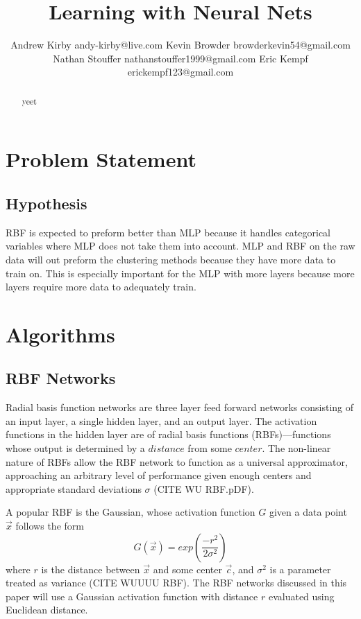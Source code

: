 \documentclass[twoside,11pt]{article}
\begin{document}
\title{Learning with Neural Nets}

\author{\name Andrew Kirby \email andy-kirby@live.com \AND
		\name Kevin Browder \email browderkevin54@gmail.com \AND
		\name Nathan Stouffer \email nathanstouffer1999@gmail.com \AND
		\name Eric Kempf \email erickempf123@gmail.com }

\maketitle

\begin{abstract}
yeet
\end{abstract}

\section{Problem Statement}



\subsection*{Hypothesis}
RBF is expected to preform better than MLP because it handles categorical variables where MLP does not take them into account. MLP and RBF on the raw data will out preform the clustering methods because they have more data to train on. This is especially important for the MLP with more layers because more layers require more data to adequately train.
\section{Algorithms}
\subsection{RBF Networks}
	Radial basis function networks are three layer feed forward networks consisting of an input layer, a single hidden layer, and an output layer. The activation functions in the hidden layer are of radial basis functions (RBFs)---functions whose output is determined by a $distance$ from some $center$. The non-linear nature of RBFs allow the RBF network to function as a universal approximator, approaching an arbitrary level of performance given enough centers and appropriate standard deviations $\sigma$ (CITE WU RBF.pDF). %
	
	A popular RBF is the Gaussian, whose activation function $G$ given a data point $\vec{x}$ follows the form
	$$G(\vec{x}) = exp({\frac{-r^2}{2\sigma^2}})$$
	where $r$ is the distance between $\vec x$ and some center $\vec c$, and $\sigma^2$ is a parameter treated as variance (CITE WUUUU RBF). The RBF networks discussed in this paper will use a Gaussian activation function with distance $r$ evaluated using Euclidean distance.
	
\end{document}
